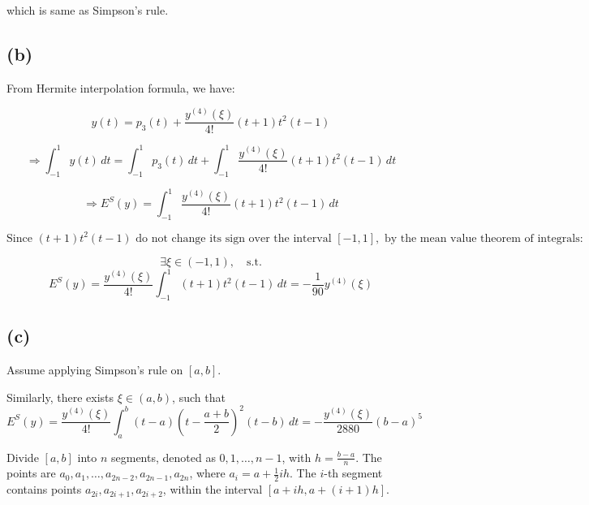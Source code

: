 \documentclass[a4paper]{article}
\begin{document}
which is same as Simpson's rule.

\subsection*{(b)}

From Hermite interpolation formula, we have: 

\begin{equation*}
y(t) = p_3(t) + \frac{y^{(4)}(\xi)}{4!} (t+1)t^2(t-1)
\end{equation*}

\begin{equation*}
\Rightarrow \int_{-1}^{1} y(t) \, dt = \int_{-1}^{1} p_3(t) \, dt + \int_{-1}^{1} \frac{y^{(4)}(\xi)}{4!} (t+1)t^2(t-1) \, dt
\end{equation*}

\begin{equation*}
\Rightarrow E^S(y) = \int_{-1}^{1} \frac{y^{(4)}(\xi)}{4!} (t+1)t^2(t-1) \, dt
\end{equation*}

\begin{equation*}
\text{Since } (t+1)t^2(t-1) \text{ do not change its sign over the interval } [-1, 1], \text{ by the mean value theorem of integrals:}
\end{equation*}

\begin{equation*}
\exists \xi \in (-1,1),\quad \text{s.t.}
\end{equation*}
\begin{equation*}
E^S(y) = \frac{y^{(4)}(\xi)}{4!} \int_{-1}^{1} (t+1)t^2(t-1) \, dt = -\frac{1}{90} y^{(4)}(\xi)
\end{equation*}

\subsection*{(c)}

Assume applying Simpson's rule on $[a,b]$.

Similarly, there exists $\xi \in (a, b)$, such that
\begin{equation*}
E^S(y) = \frac{y^{(4)}(\xi)}{4!} \int_a^b (t-a)\left(t-\frac{a+b}{2}\right)^2(t-b) \, dt = -\frac{y^{(4)}(\xi)}{2880}(b-a)^5
\end{equation*}

Divide $[a,b]$ into $n$ segments, denoted as $0, 1, \ldots, n-1$, with $h = \frac{b-a}{n}$. The points are $a_0, a_1, \ldots, a_{2n-2}, a_{2n-1}, a_{2n}$, where $a_i = a + \frac{1}{2} ih$. The $i$-th segment contains points $a_{2i}, a_{2i+1}, a_{2i+2}$, within the interval $[a+ih, a+(i+1)h]$.
\end{document}
